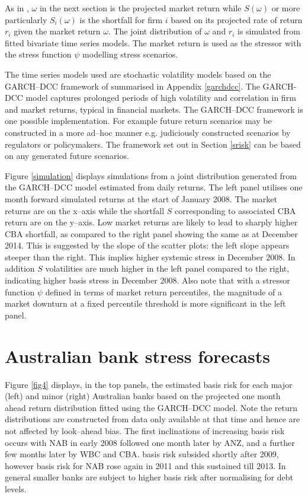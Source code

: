 \documentclass[authoryear]{elsarticle}
\newcommand{\fref}[1]{Figure \ref{#1}}
\newcommand{\sref}[1]{Section \ref{#1}}
\newcommand{\aref}[1]{Appendix \ref{#1}}
\begin{document}
 As in \cite{brownlees2015},  $\omega$ in the next section is the projected  market return while $S(\omega)$ or more particularly $S_i(\omega)$  is the shortfall for firm $i$ based on its projected rate of return $r_i$ given the market return $\omega$.   The joint distribution of $\omega$ and $r_i$ is simulated  from  fitted bivariate time series models.  The market return is used as the stressor with the stress function $\psi$ modelling  stress scenarios.

The time series models used are stochastic volatility models based on the GARCH--DCC framework of \cite{engle2002dynamic} summarised in \aref{garchdcc}. The GARCH-DCC model captures prolonged periods of high volatility and correlation in firm and market returns, typical in financial markets. The GARCH--DCC framework is one possible implementation.   For example future return scenarios may be constructed in a more ad--hoc manner e.g. judiciously constructed scenarios by regulators or policymakers.   The  framework set out in \sref{srisk} can be based on  any  generated  future  scenarios.

\fref{simulation} displays simulations from a joint distribution generated from the GARCH--DCC model estimated from daily returns.  The left panel utilises  one month forward simulated returns at the start of January 2008.   The market returns are on the x--axis while the shortfall $S$ corresponding to associated CBA return are on the y--axis.  Low market returns are likely to lead to sharply higher CBA shortfall, as compared to the right panel showing the same as at December 2014.   This is suggested by the slope of the scatter plots:  the left slope appears steeper than the right. This implies higher systemic stress in December 2008. In addition $S$ volatilities are much higher in the left panel compared to the right, indicating higher basis stress in December 2008. Also note that with a stressor function $\psi$ defined in terms of market return percentiles, the magnitude of a market downturn at a fixed percentile threshold is more significant in the left panel.

\section{Australian bank stress forecasts}\label{simulate1}

\fref{fig4} displays, in the top panels, the estimated basis risk for each major (left) and minor (right) Australian banks based on the projected one month ahead return distribution fitted using the GARCH--DCC model.  Note the return distributions are constructed from data only available at that time and hence are not affected by look--ahead bias.  The first inclinations of increasing basis risk occurs with NAB in early 2008 followed one month later by ANZ, and  a further few months later by WBC and CBA. basis risk subsided shortly after 2009, however basis risk for NAB rose again in 2011 and this sustained till 2013.  In general smaller banks are subject to higher basis risk after normalising for debt levels.
\end{document}
